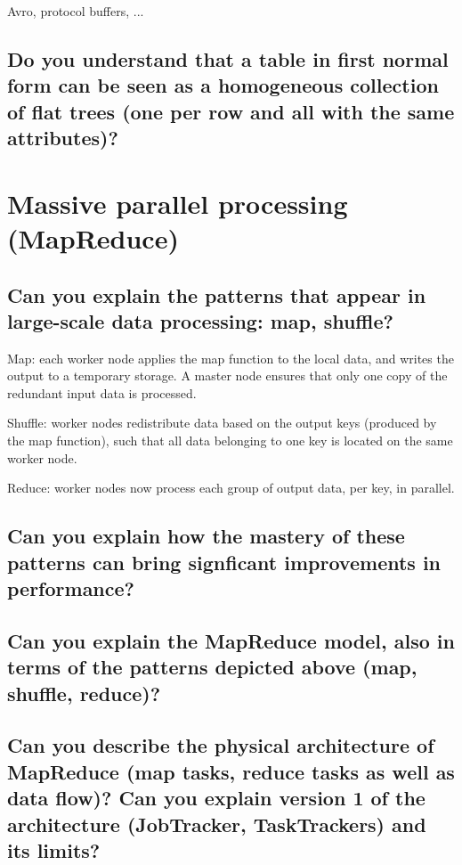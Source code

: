 \documentclass{article}
\begin{document}
Avro, protocol buffers, ...

\subsection{Do you understand that a table in first normal form can be seen as a homogeneous collection of flat trees (one per row and all with the same attributes)?}



\pagebreak

\section{Massive parallel processing (MapReduce)}
\subsection{Can you explain the patterns that appear in large-scale data processing: map, shuffle?}

Map: each worker node applies the map function to the local data, and writes the output to a temporary storage. A master node ensures that only one copy of the redundant input data is processed.

Shuffle: worker nodes redistribute data based on the output keys (produced by the map function), such that all data belonging to one key is located on the same worker node.

Reduce: worker nodes now process each group of output data, per key, in parallel.

\subsection{Can you explain how the mastery of these patterns can bring signficant improvements in performance?}



\subsection{Can you explain the MapReduce model, also in terms of the patterns depicted above (map, shuffle, reduce)?}
\subsection{Can you describe the physical architecture of MapReduce (map tasks, reduce tasks as well as data flow)? Can you explain version 1 of the architecture (JobTracker, TaskTrackers) and its limits?}
\end{document}
